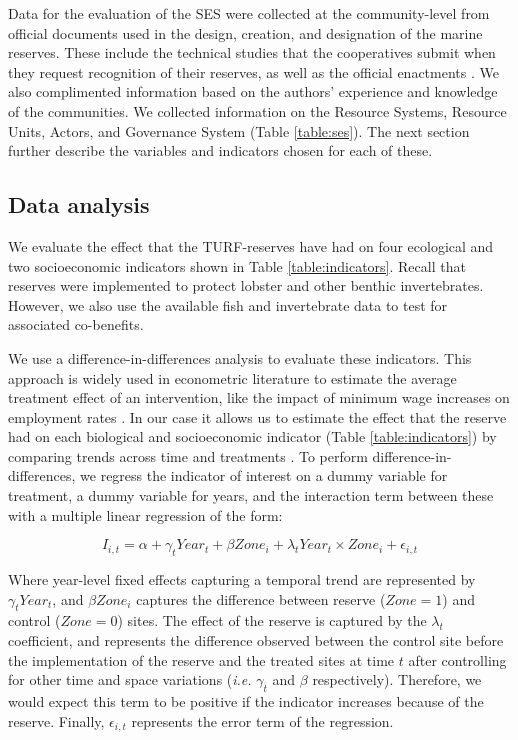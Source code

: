 \documentclass{frontiersSCNS}
\begin{document}
Data for the evaluation of the SES were collected at the community-level
from official documents used in the design, creation, and designation of
the marine reserves. These include the technical studies that the
cooperatives submit when they request recognition of their reserves, as
well as the official enactments
\citep{dof_website_2012,dof_website_2013,dof_website_2018}. We also
complimented information based on the authors' experience and knowledge
of the communities. We collected information on the Resource Systems,
Resource Units, Actors, and Governance System (Table \ref{table:ses}).
The next section further describe the variables and indicators chosen
for each of these.

\hypertarget{data-analysis}{%
\subsection{Data analysis}\label{data-analysis}}

We evaluate the effect that the TURF-reserves have had on four
ecological and two socioeconomic indicators shown in Table
\ref{table:indicators}. Recall that reserves were implemented to protect
lobster and other benthic invertebrates. However, we also use the
available fish and invertebrate data to test for associated co-benefits.

We use a difference-in-differences analysis to evaluate these
indicators. This approach is widely used in econometric literature to
estimate the average treatment effect of an intervention, like the
impact of minimum wage increases on employment rates \citep{card_1994}.
In our case it allows us to estimate the effect that the reserve had on
each biological and socioeconomic indicator (Table
\ref{table:indicators}) by comparing trends across time and treatments
\citep{moland_2013,Villasenor-Derbez_2018}. To perform
difference-in-differences, we regress the indicator of interest on a
dummy variable for treatment, a dummy variable for years, and the
interaction term between these with a multiple linear regression of the
form:

\begin{equation}
I_{i,t} = \alpha + \gamma_{t} Year_t + \beta Zone_i + \lambda_{t} Year_t\times Zone_i + \epsilon_{i,t}
\label{eqn:reg_bio}
\end{equation}

Where year-level fixed effects capturing a temporal trend are
represented by \(\gamma_t Year_t\), and \(\beta Zone_i\) captures the
difference between reserve (\(Zone = 1\)) and control (\(Zone = 0\))
sites. The effect of the reserve is captured by the \(\lambda_t\)
coefficient, and represents the difference observed between the control
site before the implementation of the reserve and the treated sites at
time \(t\) after controlling for other time and space variations
(\emph{i.e.} \(\gamma_t\) and \(\beta\) respectively). Therefore, we
would expect this term to be positive if the indicator increases because
of the reserve. Finally, \(\epsilon_{i,t}\) represents the error term of
the regression.
\end{document}

